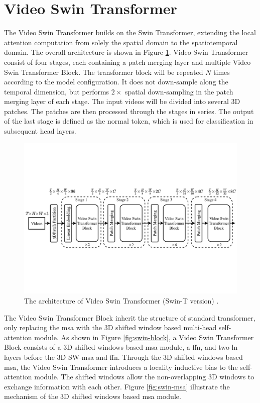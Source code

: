 \section{Video Swin Transformer}
\label{sec:Video Swin Transformer}
The Video Swin Transformer builds on the Swin Transformer, extending the local attention computation from solely the spatial domain to the spatiotemporal domain. The overall architecture is shown in Figure \ref{fig:swin-transformer}. Video Swin Transformer consist of four stages, each containing a patch merging layer and multiple Video Swin Transformer Block. The transformer block will be repeated $N$ times according to the model configuration. It does not down-sample along the temporal dimension, but performs $2\times$ spatial down-sampling in the patch merging layer of each stage. The input videos will be divided into several 3D patches. The patches are then processed through the stages in series. The output of the last stage is defined as the normal token, which is used for classification in subsequent head layers.
\begin{figure}[htbp]
    \centering
    \includegraphics[width=\textwidth]{graphics/Swin_overview.pdf}
    \caption{The architecture of Video Swin Transformer (Swin-T version) \cite{liu_video_2021}.}
    \label{fig:swin-transformer}
\end{figure}

The Video Swin Transformer Block inherit the structure of standard transformer, only replacing the \gls{msa} with the 3D shifted window based multi-head self-attention module. As shown in Figure \ref{fig:swin-block}, a Video Swin Transformer Block consists of a 3D shifted windows based \gls{msa} module, a \gls{ffn}, and two \gls{ln} layers before the 3D SW-\gls{msa} and \gls{ffn}. Through the 3D shifted windows based \gls{msa}, the Video Swin Transformer introduces a locality inductive bias to the self-attention module. The shifted windows allow the non-overlapping 3D windows to exchange information with each other. Figure \ref{fig:swin-msa} illustrate the mechanism of the 3D shifted windows based \gls{msa} module. 
\vspace{5mm}

